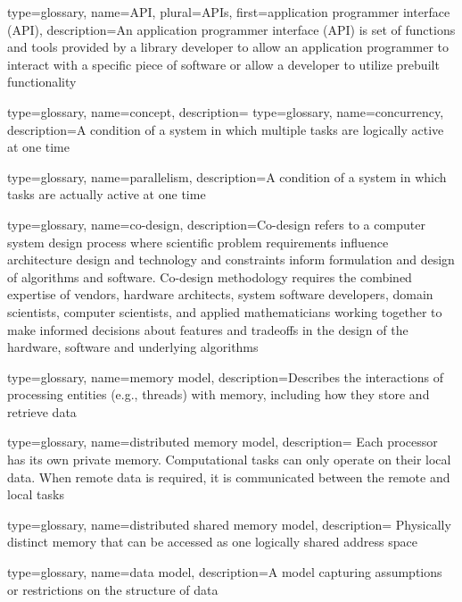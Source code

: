 {
  type=glossary,
  name={API},
  plural={APIs},
  first={application programmer interface (API)},
  description={An application programmer interface (API) is set of functions and tools provided by a library developer to allow an application programmer to interact with a specific piece of software or allow a developer to utilize prebuilt functionality}
}

{
  type=glossary,
  name={concept},
  description={}
}
{
  type=glossary,
  name={concurrency},
  description={A condition of a system in which multiple tasks are logically
    active at one time}
}

{
  type=glossary,
  name={parallelism},
  description={A condition of a system in which tasks are actually active at
    one time}
}

{
  type=glossary,
  name=co-design,
  description={Co-design refers to a computer system design process where
    scientific problem requirements influence architecture design and
      technology and constraints inform formulation and design of algorithms
      and software.  Co-design methodology requires the combined expertise of
      vendors, hardware architects, system software developers, domain
      scientists, computer scientists, and applied mathematicians working
      together to make informed decisions about features and tradeoffs in the
      design of the hardware, software and underlying
      algorithms~\cite{co-design}}
}

{
  type=glossary,
  name={memory model},
  description={Describes the interactions of processing entities (e.g.,
      threads) with memory, including how they store and retrieve data}
}

{
  type=glossary,
  name={distributed memory model},
  description={ Each processor has its own private memory. 
     Computational tasks can only operate on their local data. When remote data
     is required, it is communicated between the remote and local tasks}
}

{
  type=glossary,
  name={distributed shared memory model},
  description={ Physically distinct memory that can be accessed as one
    logically shared address space}
}

{
  type=glossary,
  name={data model},
  description={A model capturing assumptions or restrictions on the structure of data}
}


